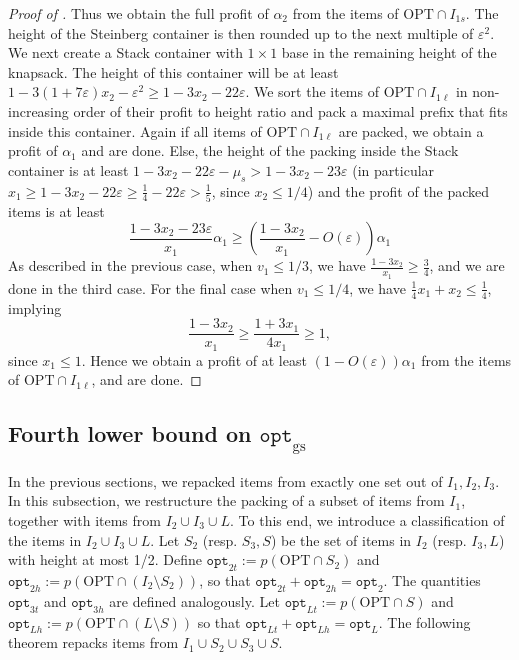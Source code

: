 \documentclass[10pt,a4paper]{amsart}
\renewcommand{\epsilon}{\varepsilon} %
\theoremstyle{definition}
\newcommand{\opt}{\mathtt{opt}}
\newcommand{\optgs}{\mathtt{opt}_{\mathrm{gs}}}
\newcommand{\opttwot}{\mathtt{opt}_{2t}}
\newcommand{\opttwoh}{\mathtt{opt}_{2h}}
\newcommand{\optthreet}{\mathtt{opt}_{3t}}
\newcommand{\optthreeh}{\mathtt{opt}_{3h}}
\newcommand{\optlt}{\mathtt{opt}_{Lt}}
\newcommand{\optlh}{\mathtt{opt}_{Lh}}
\begin{document}
\begin{proof}[Proof of ]
    Thus we obtain the full profit of $\alpha_2$ from the items of $\text{OPT}\cap I_{1s}$. The height of the Steinberg container is then rounded up to the next multiple of $\epsilon^2$. We next create a Stack container with $1\times 1$ base in the remaining height of the knapsack. The height of this container will be at least $1-3(1+7\epsilon)x_2-\epsilon^2 \ge 1-3x_2-22\epsilon$. We sort the items of $\text{OPT}\cap I_{1\ell}$ in non-increasing order of their profit to height ratio and pack a maximal prefix that fits inside this container. Again if all items of $\text{OPT}\cap I_{1\ell}$ are packed, we obtain a profit of $\alpha_1$ and are done. Else, the height of the packing inside the Stack container is at least $1-3x_2-22\epsilon-\mu_s > 1-3x_2-23\epsilon$ (in particular $x_1\ge 1-3x_2-22\epsilon  \ge \frac{1}{4}-22\epsilon>\frac{1}{5}$, since $x_2\le 1/4$) and the profit of the packed items is at least
    \[ \frac{1-3x_2-23\epsilon}{x_1}\alpha_1 \ge \left(\frac{1-3x_2}{x_1}-O(\epsilon)\right)\alpha_1\]
    As described in the previous case, when $v_1\le 1/3$, we have $\frac{1-3x_2}{x_1}\ge \frac{3}{4}$, and we are done in the third case. For the final case when $v_1 \le 1/4$, we have $\frac{1}{4}x_1+x_2 \le \frac{1}{4}$, implying
    \[ \frac{1-3x_2}{x_1} \ge \frac{1+3x_1}{4x_1}\ge 1,\]
    since $x_1 \le 1$. Hence we obtain a profit of at least $(1-O(\epsilon))\alpha_1$ from the items of $\text{OPT}\cap I_{1\ell}$, and are done.    
\end{proof}
\fi




\subsection{Fourth lower bound on \texorpdfstring{$\optgs$}{optgs}}
\label{sec:fourthlb}
In the previous sections, we repacked items from exactly one set out of $I_1, I_2, I_3$. In this subsection, we restructure the packing of a subset of items from $I_1$, together with items from $I_2\cup I_3\cup L$. To this end, we introduce a classification of the items in $I_2\cup I_3\cup L$. 
Let $S_2$ (resp. $S_3,S$) be the set of items in $I_2$ (resp. $I_3,L$) with height at most 1/2. Define $\opttwot := p(\text{OPT}\cap S_2)$ and $\opttwoh := p(\text{OPT}\cap (I_2\setminus S_2))$, so that $\opttwot+\opttwoh = \opt_2$. The quantities $\optthreet$ and $\optthreeh$ are defined analogously. Let $\optlt := p(\text{OPT}\cap S)$ and $\optlh := p(\text{OPT}\cap (L\setminus S))$ so that $\optlt+\optlh = \opt_L$. The following theorem repacks items from $I_1\cup S_2\cup S_3\cup S$.
\end{document}

